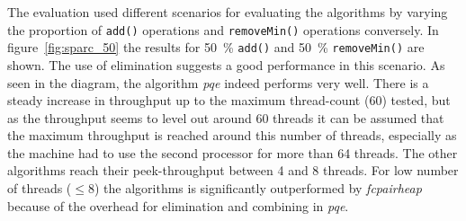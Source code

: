 The evaluation used different scenarios for evaluating the algorithms by varying the proportion of \texttt{add()} operations and \texttt{removeMin()} operations conversely. In figure~\ref{fig:sparc_50} the results for 50~\% \texttt{add()} and 50~\% \texttt{removeMin()} are shown. The use of elimination suggests a good performance in this scenario. As seen in the diagram, the algorithm \textit{pqe} indeed performs very well. There is a steady increase in throughput up to the maximum thread-count ($60$) tested, but as the throughput seems to level out around 60 threads it can be assumed that the maximum throughput is reached around this number of threads, especially as the machine had to use the second processor for more than 64 threads. The other algorithms reach their peek-throughput between 4 and 8 threads. For low number of threads ($\le 8$) the algorithms is significantly outperformed by \textit{fcpairheap} because of the overhead for elimination and combining in \textit{pqe}.

